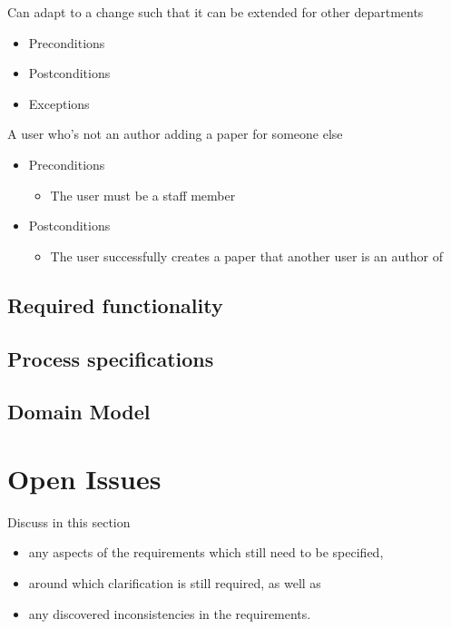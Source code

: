 \documentclass[a4paper,12pt]{article}
\begin{document}
Can adapt to a change such that it can be extended for other departments
\begin{itemize}
    \item Preconditions
    \item Postconditions
    \item Exceptions
\end{itemize}
A user who's not an author adding a paper for someone else
\begin{itemize}
    \item Preconditions
    \begin{itemize}
        \item The user must be a staff member
    \end{itemize}
    \item Postconditions
    \begin{itemize}
        \item The user successfully creates a paper that another user is an author of
    \end{itemize}
\end{itemize}
\subsection{Required functionality}

\subsection{Process specifications}

\subsection{Domain Model}

\section{Open Issues}

Discuss in this section
\begin{itemize}
\item any aspects of the requirements which still need to be specified,
\item around which clarification is still required, as well as
\item any discovered inconsistencies in the requirements.
\end{itemize}
\end{document}
